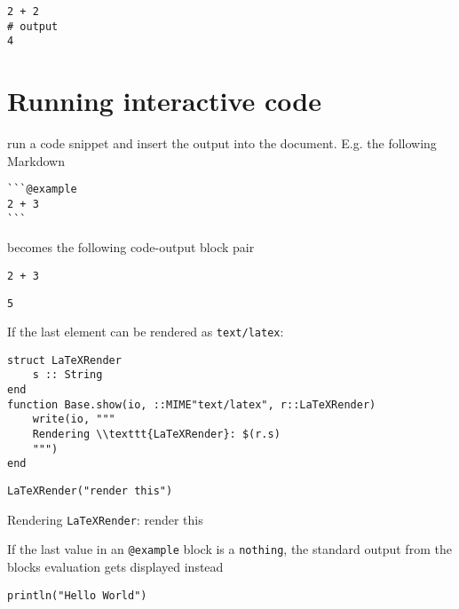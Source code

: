 \begin{verbatim}
2 + 2
# output
4
\end{verbatim}



\section{Running interactive code}



\label{3545462789522369084}{}


 run a code snippet and insert the output into the document. E.g. the following Markdown




\begin{verbatim}
```@example
2 + 3
```
\end{verbatim}



becomes the following code-output block pair




\begin{verbatim}
2 + 3
\end{verbatim}


\begin{lstlisting}
5
\end{lstlisting}



If the last element can be rendered as \texttt{text/latex}:




\begin{verbatim}
struct LaTeXRender
    s :: String
end
function Base.show(io, ::MIME"text/latex", r::LaTeXRender)
    write(io, """
    Rendering \\texttt{LaTeXRender}: $(r.s)
    """)
end
\end{verbatim}




\begin{verbatim}
LaTeXRender("render this")
\end{verbatim}

Rendering \texttt{LaTeXRender}: render this


If the last value in an \texttt{@example} block is a \texttt{nothing}, the standard output from the blocks{\textquotesingle} evaluation gets displayed instead




\begin{verbatim}
println("Hello World")
\end{verbatim}


